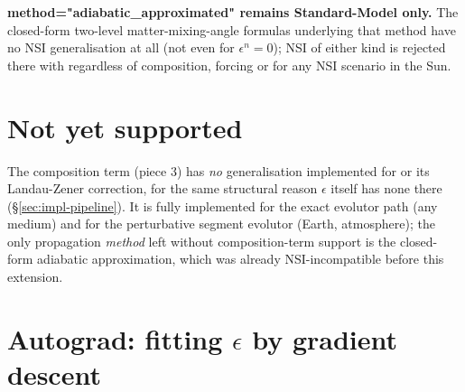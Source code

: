 \begin{notebox}
\textbf{method="adiabatic\_approximated" remains Standard-Model only.} The
closed-form two-level matter-mixing-angle formulas underlying that method
have no NSI generalisation at all (not even for $\epsilon^n=0$); NSI of
either kind is rejected there with  regardless of
composition, forcing  or
 for any NSI scenario in the Sun.
\end{notebox}

\section{Not yet supported}

\begin{notebox}
The composition term (piece 3) has \emph{no} generalisation implemented for
 or
its Landau-Zener correction, for the same structural reason $\epsilon$
itself has none there (\S\ref{sec:impl-pipeline}). It is fully implemented
for the exact evolutor path (any medium) and for the perturbative segment
evolutor (Earth, atmosphere); the only propagation \emph{method} left
without composition-term support is the closed-form adiabatic
approximation, which was already NSI-incompatible before this extension.
\end{notebox}

\section{Autograd: fitting $\epsilon$ by gradient descent}
\label{sec:impl-autograd}


